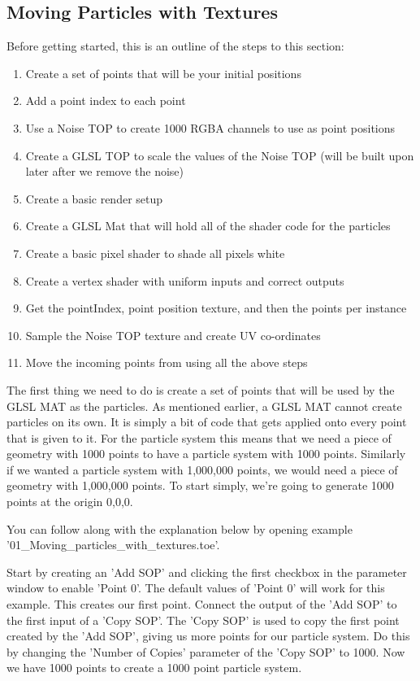 \subsection{Moving Particles with Textures}
\begin{fullwidth}
Before getting started, this is an outline of the steps to this section:
\begin{enumerate}
\item Create a set of points that will be your initial positions
\item Add a point index to each point
\item Use a Noise TOP to create 1000 RGBA channels to use as point positions
\item Create a GLSL TOP to scale the values of the Noise TOP (will be built upon later after we remove the noise)
\item Create a basic render setup
\item Create a GLSL Mat that will hold all of the shader code for the particles
\item Create a basic pixel shader to shade all pixels white
\item Create a vertex shader with uniform inputs and correct outputs
\item Get the pointIndex, point position texture, and then the points per instance
\item Sample the Noise TOP texture and create UV co-ordinates
\item Move the incoming points from using all the above steps
\end{enumerate}

The first thing we need to do is create a set of points that will be used by the GLSL MAT as the particles. As mentioned earlier, a GLSL MAT cannot create particles on its own. It is simply a bit of code that gets applied onto every point that is given to it. For the particle system this means that we need a piece of geometry with 1000 points to have a particle system with 1000 points. Similarly if we wanted a particle system with 1,000,000 points, we would need a piece of geometry with 1,000,000 points. To start simply, we're going to generate 1000 points at the origin 0,0,0.

You can follow along with the explanation below by opening example '01\_Moving\_particles\_with\_textures.toe'.

Start by creating an 'Add SOP' and clicking the first checkbox in the parameter window to enable 'Point 0'. The default values of 'Point 0' will work for this example. This creates our first point. Connect the output of the 'Add SOP' to the first input of a 'Copy SOP'. The 'Copy SOP' is used to copy the first point created by the 'Add SOP', giving us more points for our particle system. Do this by changing the 'Number of Copies' parameter of the 'Copy SOP' to 1000. Now we have 1000 points to create a 1000 point particle system.


\end{fullwidth}

